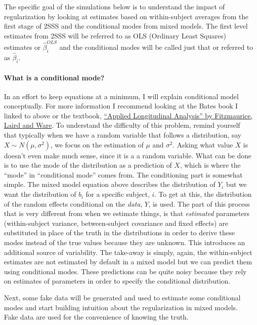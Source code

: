 \documentclass[
]{book}
\begin{document}
The specific goal of the simulations below is to understand the impact of regularization by looking at estimates based on within-subject averages from the first stage of 2SSS and the conditional modes from mixed models. The first level estimates from 2SSS will be referred to as OLS (Ordinary Least Squares) estimates or \(\hat\beta_i^{OLS}\) and the conditional modes will be called just that or referred to as \(\hat\beta_i\).

\hypertarget{what-is-a-conditional-mode}{%
\paragraph{What is a conditional mode?}\label{what-is-a-conditional-mode}}

In an effort to keep equations at a minimum, I will explain conditional model conceptually. For more information I recommend looking at the Bates book I linked to above or the textbook, \href{https://www.amazon.com/Applied-Longitudinal-Analysis-Garrett-Fitzmaurice/dp/0470380276}{``Applied Longitudinal Analysis'' by Fitzmaurice, Laird and Ware}. To understand the difficulty of this problem, remind yourself that typically when we have a random variable that follows a distribution, say \(X \sim N(\mu, \sigma^2)\), we focus on the estimation of \(\mu\) and \(\sigma^2\). Asking what value \(X\) is doesn't even make much sense, since it is a a random variable. What can be done is to use the mode of the distribution as a prediction of \(X\), which is where the ``mode'' in ``conditional mode'' comes from. The conditioning part is somewhat simple. The mixed model equation above describes the distribution of \(Y_i\) but we want the distribution of \(b_i\) for a specific subject, \(i\). To get at this, the distribution of the random effects conditional on the \emph{data}, \(Y\), is used. The part of this process that is very different from when we estimate things, is that \emph{estimated} parameters (within-subject variance, between-subject covariance and fixed effects) are substituted in place of the truth in the distributions in order to derive these modes instead of the true values because they are unknown. This introduces an additional source of variability. The take-away is simply, again, the within-subject estimates are not estimated by default in a mixed model but we can predict them using conditional modes. These predictions can be quite noisy because they rely on estimates of parameters in order to specify the conditional distribution.

Next, some fake data will be generated and used to estimate some conditional modes and start building intuition about the regularization in mixed models. Fake data are used for the convenience of knowing the truth.
\end{document}

